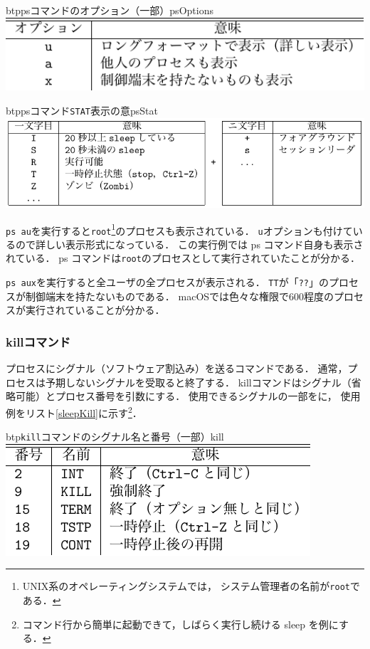 \begin{mytable}{btp}{psコマンドのオプション（一部）}{psOptions}
  \includegraphics[scale=1.0]{Tbl/psOptions.pdf}
\end{mytable}



\begin{mytable}{btp}{psコマンド\texttt{STAT}表示の意}{psStat}
  \includegraphics[scale=1.0]{Tbl/psStat.pdf}
\end{mytable}

\texttt{ps au}を実行すると\texttt{root}\footnote{
UNIX系のオペレーティングシステムでは，
システム管理者の名前が\texttt{root}である．}のプロセスも表示されている．
\texttt{u}オプションも付けているので詳しい表示形式になっている．
この実行例では ps コマンド自身も表示されている．
ps コマンドは\texttt{root}のプロセスとして実行されていたことが分かる．

\texttt{ps aux}を実行すると全ユーザの全プロセスが表示される．
\texttt{TT}が「\texttt{??}」のプロセスが制御端末を持たないものである．
macOSでは色々な権限で600程度のプロセスが実行されていることが分かる．

\subsubsection{killコマンド}

プロセスにシグナル（ソフトウェア割込み）を送るコマンドである．
通常，プロセスは予期しないシグナルを受取ると終了する．
killコマンドはシグナル（省略可能）とプロセス番号を引数にする．
使用できるシグナルの一部をに，
使用例をリスト\ref{sleepKill}に示す\footnote{
コマンド行から簡単に起動できて，しばらく実行し続ける sleep を例にする．
}．

\begin{mytable}{btp}{\texttt{kill}コマンドのシグナル名と番号（一部）}{kill}
  \includegraphics[scale=1.0]{Tbl/killOptions.pdf}
\end{mytable}

